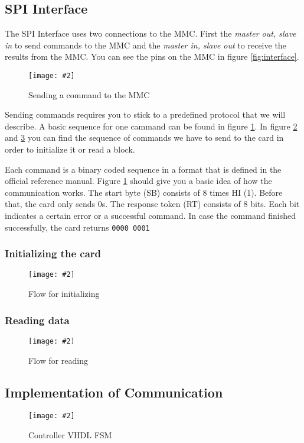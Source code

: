 \documentclass[12pt, a4paper]{article}
\newcommand{\image}[5]{
	\begin{figure}[#4]               %
		\centering                     %
		\texttt{[image: \#2]} %
		\caption{#3}                   %
		\label{fig:#5}                 %
	\end{figure}                     %
}
\begin{document}
\subsection{SPI Interface}

The SPI Interface uses two connections to the MMC. First the \emph{master out, slave in} to send commands to the MMC and the \emph{master in, slave out} to receive the results from the MMC. You can see the pins on the MMC in figure \ref{fig:interface}.

\image{0.8\textwidth}{../spi_mmc_command.pdf}{Sending a command to the MMC}{ht}{command}

Sending commands requires you to stick to a predefined protocol that we will describe. A basic sequence for one cammand can be found in figure \ref{fig:command}. In figure \ref{fig:init} and \ref{fig:read} you can find the sequence of commands we have to send to the card in order to initialize it or read a block. 

Each command is a binary coded sequence in a format that is defined in the official reference manual. Figure \ref{fig:command} should give you a basic idea of how the communication works. The start byte (SB) consists of 8 times HI (1). Before that, the card only sends 0s. The response token (RT) consists of 8 bits. Each bit indicates a certain error or a successful command. In case the command finished successfully, the card returns \texttt{0000 0001}

\subsubsection{Initializing the card}

\image{0.5\textwidth}{../flow_init_mmc.pdf}{Flow for initializing}{ht}{init}

\subsubsection{Reading data}

\image{0.5\textwidth}{../flow_read_mmc.pdf}{Flow for reading}{ht}{read}

\subsection{Implementation of Communication}
\image{1.0\textwidth}{../mmc_controller.pdf}{Controller VHDL FSM}{ht}{implementation}

\listoffigures
\end{document}
